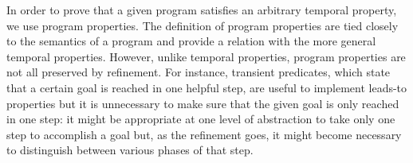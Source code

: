 In order to prove that a given program satisfies an arbitrary temporal property, we use program properties.  The definition of program properties are tied closely to the semantics of a program and provide a relation with the more general temporal properties.  However, unlike temporal properties, program properties are not all preserved by refinement.  For instance, transient predicates, which state that a certain goal is reached in one helpful step, are useful to implement leads-to properties but it is unnecessary to make sure that the given goal is only reached in one step: it might be appropriate at one level of abstraction to take only one step to accomplish a goal but, as the refinement goes, it might become necessary to distinguish between various phases of that step.
